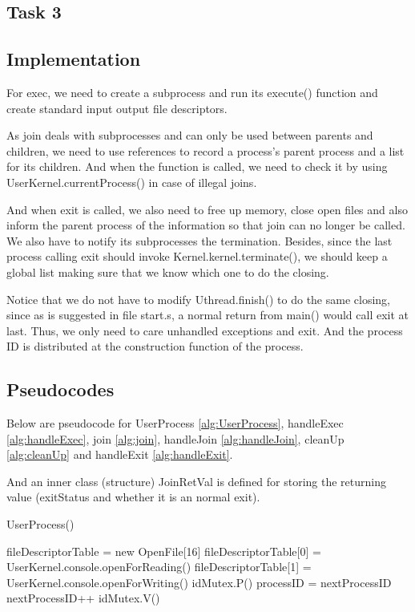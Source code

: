 \documentclass{article}
\begin{document}
\begin{spacing}{1.1}
\section{Task 3}
\subsection{Implementation}
For \textsf{exec}, we need to create a subprocess and run its \textsf{execute()} function and create standard input output file descriptors.

As \textsf{join} deals with subprocesses and can only be used between parents and children, we need to use references to record a process's parent process and a list for its children. And when the function is called, we need to check it by using \textsf{UserKernel.currentProcess()} in case of illegal joins.

And when \textsf{exit} is called, we also need to free up memory, close open files and also inform the parent process of the information so that \textsf{join} can no longer be called. We also have to notify its subprocesses the termination. Besides, since the last process calling \textsf{exit} should invoke \textsf{Kernel.kernel.terminate()}, we should keep a global list making sure that we know which one to do the closing.

Notice that we do not have to modify \textsf{Uthread.finish()} to do the same closing, since as is suggested in file \textsf{start.s}, a normal return from \textsf{main()} would call \textsf{exit} at last. Thus, we only need to care unhandled exceptions and \textsf{exit}. And the process ID is distributed at the construction function of the process.
\subsection{Pseudocodes}
Below are pseudocode for \textsf{UserProcess} \ref{alg:UserProcess}, \textsf{handleExec} \ref{alg:handleExec}, \textsf{join} \ref{alg:join}, \textsf{handleJoin} \ref{alg:handleJoin}, \textsf{cleanUp} \ref{alg:cleanUp} and \textsf{handleExit} \ref{alg:handleExit}.

And an inner class (structure) \textsf{JoinRetVal} is defined for storing the returning value (exitStatus and whether it is an normal exit).
\begin{algorithm}
  \label{alg:UserProcess}
  \caption{\textsf{UserProcess}()}
  fileDescriptorTable = new OpenFile[16]\;
  fileDescriptorTable[0] = UserKernel.console.openForReading()\;
  fileDescriptorTable[1] = UserKernel.console.openForWriting()\;
  \colorbox{myyellow}{idMutex.P()}\;
  processID = nextProcessID\;
  nextProcessID++\;
  \colorbox{myyellow}{idMutex.V()}\;
\end{algorithm}


\end{spacing}
\end{document}
